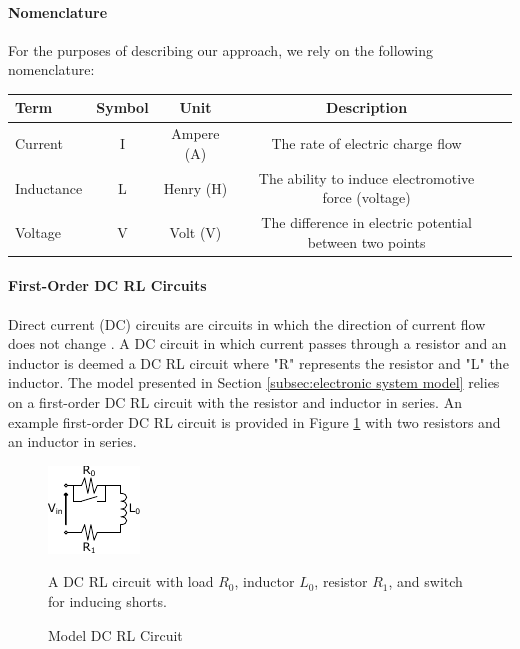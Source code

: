 \paragraph{Nomenclature}
For the purposes of describing our approach, we rely on the following nomenclature:

\begin{center}
\bgroup
\def\arraystretch{1.0}%
\begin{tabular}{| l | c | c | c | l |}
    \hline
    Term & Symbol & Unit & Description\\  \hline \hline \cline{1-4}
    Current & I & Ampere (A) & The rate of electric charge flow \\ \cline{1-4}
    Inductance & L & Henry (H) & The ability to induce electromotive force (voltage)\\ \cline{1-4}
    Voltage & V & Volt (V) & The difference in electric potential between two points\\ \cline{1-4}
    \hline  
\end{tabular}
\egroup
\end{center}

\paragraph{First-Order DC RL Circuits}
Direct current (DC) circuits are circuits in which the direction of current flow does not change \cite{uniphy}. A DC circuit in which current passes through a resistor and an inductor is deemed a DC RL circuit where "R" represents the resistor and "L" the inductor. The model presented in Section \ref{subsec:electronic system model} relies on a first-order DC RL circuit with the resistor and inductor in series. An example first-order DC RL circuit is provided in Figure \ref{fig:ModelDCRL} with two resistors and an inductor in series.
\begin{figure}
    \centering
    \includegraphics[width=0.25\linewidth]{img/Model_DC_RL_Circuit_General.pdf}
    \caption{Model DC RL Circuit} A DC RL circuit with load $R_0$, inductor $L_0$, resistor $R_1$, and switch for inducing shorts.
    \label{fig:ModelDCRL}
\end{figure}
